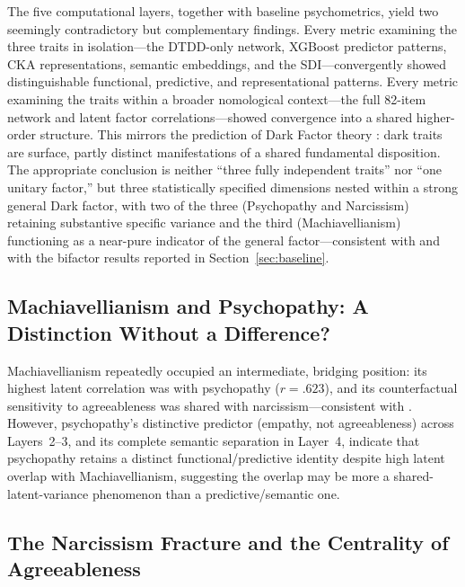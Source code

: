 \documentclass[11pt,twocolumn]{article}
\begin{document}
The five computational layers, together with baseline psychometrics, yield two seemingly contradictory but complementary findings. Every metric examining the three traits in isolation---the DTDD-only network, XGBoost predictor patterns, CKA representations, semantic embeddings, and the SDI---convergently showed distinguishable functional, predictive, and representational patterns. Every metric examining the traits within a broader nomological context---the full 82-item network and latent factor correlations---showed convergence into a shared higher-order structure. This mirrors the prediction of Dark Factor theory \citep{moshagen2018}: dark traits are surface, partly distinct manifestations of a shared fundamental disposition. The appropriate conclusion is neither ``three fully independent traits'' nor ``one unitary factor,'' but three statistically specified dimensions nested within a strong general Dark factor, with two of the three (Psychopathy and Narcissism) retaining substantive specific variance and the third (Machiavellianism) functioning as a near-pure indicator of the general factor---consistent with \citet{vize2018} and with the bifactor results reported in Section~\ref{sec:baseline}.

\subsection{Machiavellianism and Psychopathy: A Distinction Without a Difference?}

Machiavellianism repeatedly occupied an intermediate, bridging position: its highest latent correlation was with psychopathy ($r = .623$), and its counterfactual sensitivity to agreeableness was shared with narcissism---consistent with \citet{miller2017}. However, psychopathy's distinctive predictor (empathy, not agreeableness) across Layers~2--3, and its complete semantic separation in Layer~4, indicate that psychopathy retains a distinct functional/predictive identity despite high latent overlap with Machiavellianism, suggesting the overlap may be more a shared-latent-variance phenomenon than a predictive/semantic one.

\subsection{The Narcissism Fracture and the Centrality of Agreeableness}
\end{document}
